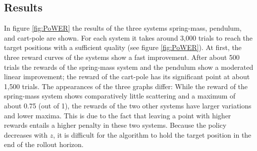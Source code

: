 \documentclass[letterpaper, 10 pt, conference]{ieeeconf}  %
\begin{document}

%

\subsection{Results}
In figure \ref{fig:PoWER} 
the results of the three systems spring-mass, pendulum, and cart-pole are shown. For each system it takes around 3,000 trials to reach the target positions with a sufficient quality (see figure \ref{fig:PoWER}). At first, the three reward curves of the systems show a fast improvement. After about 500 trials the rewards of the spring-mass system and the pendulum show a moderated linear improvement; the reward of the cart-pole has its significant point at about 1,500 trials. The appearances of the three graphs differ: While the reward of the spring-mass system shows comparatively little scattering and a maximum of about 0.75 (out of 1), the rewards of the two other systems have larger variations and lower maxima. This is due to the fact that leaving a point with higher rewards entails a higher penalty in these two systems. Because the policy decreases with $z$, it is difficult for the algorithm to hold the target position in the end of the rollout horizon.
\end{document}
